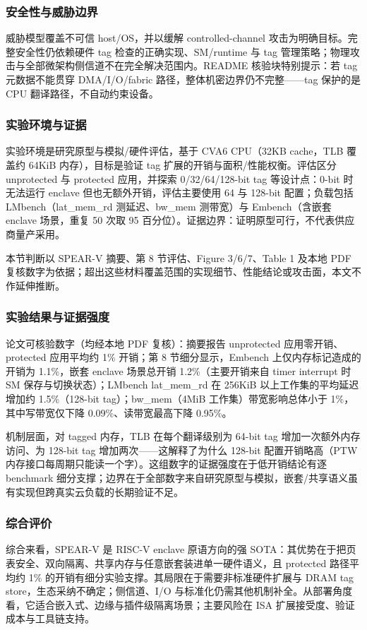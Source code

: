 \documentclass[11pt]{ctexart}
\begin{document}
\subsubsection{安全性与威胁边界}
威胁模型覆盖不可信 host/OS，并以缓解 controlled-channel 攻击为明确目标。完整安全性仍依赖硬件 tag 检查的正确实现、SM/runtime 与 tag 管理策略；物理攻击与全部微架构侧信道不在完全解决范围内。README 核验块特别提示：若 tag 元数据不能贯穿 DMA/I/O/fabric 路径，整体机密边界仍不完整——tag 保护的是 CPU 翻译路径，不自动约束设备。\par
\subsubsection{实验环境与证据}
实验环境是研究原型与模拟/硬件评估，基于 CVA6 CPU（32KB cache，TLB 覆盖约 64KiB 内存），目标是验证 tag 扩展的开销与面积/性能权衡。评估区分 unprotected 与 protected 应用，并探索 0/32/64/128-bit tag 等设计点：0-bit 时无法运行 enclave 但也无额外开销，评估主要使用 64 与 128-bit 配置；负载包括 LMbench（lat\_mem\_rd 测延迟、bw\_mem 测带宽）与 Embench（含嵌套 enclave 场景，重复 50 次取 95 百分位）。证据边界：证明原型可行，不代表供应商量产采用。\par
本节判断以 SPEAR-V 摘要、第 8 节评估、Figure 3/6/7、Table 1 及本地 PDF 复核数字为依据；超出这些材料覆盖范围的实现细节、性能结论或攻击面，本文不作延伸推断。\par
\subsubsection{实验结果与证据强度}
论文可核验数字（均经本地 PDF 复核）：摘要报告 unprotected 应用零开销、protected 应用平均约 1\% 开销；第 8 节细分显示，Embench 上仅内存标记造成的开销为 1.1\%，嵌套 enclave 场景总开销 1.2\%（主要开销来自 timer interrupt 时 SM 保存与切换状态）；LMbench lat\_mem\_rd 在 256KiB 以上工作集的平均延迟增加约 1.5\%（128-bit tag）；bw\_mem（4MiB 工作集）带宽影响总体小于 1\%，其中写带宽仅下降 0.09\%、读带宽最高下降 0.95\%。\par
机制层面，对 tagged 内存，TLB 在每个翻译级别为 64-bit tag 增加一次额外内存访问、为 128-bit tag 增加两次——这解释了为什么 128-bit 配置开销略高（PTW 内存接口每周期只能读一个字）。这组数字的证据强度在于低开销结论有逐 benchmark 细分支撑；边界在于全部数字来自研究原型与模拟，嵌套/共享语义虽有实现但跨真实云负载的长期验证不足。\par
\subsubsection{综合评价}
综合来看，SPEAR-V 是 RISC-V enclave 原语方向的强 SOTA：其优势在于把页表安全、双向隔离、共享内存与任意嵌套装进单一硬件语义，且 protected 路径平均约 1\% 的开销有细分实验支撑。其局限在于需要非标准硬件扩展与 DRAM tag store，生态采纳不确定；侧信道、I/O 与标准化仍需其他机制补全。从部署角度看，它适合嵌入式、边缘与插件级隔离场景；主要风险在 ISA 扩展接受度、验证成本与工具链支持。\par
\end{document}
